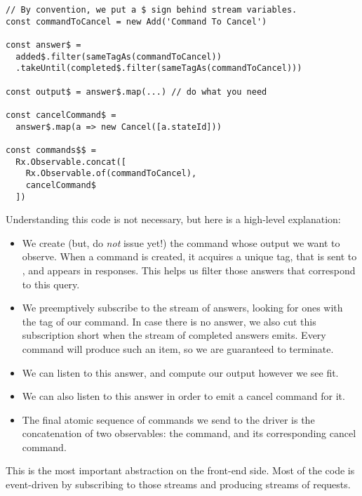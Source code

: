\begin{verbatim}
// By convention, we put a $ sign behind stream variables.
const commandToCancel = new Add('Command To Cancel')

const answer$ =
  added$.filter(sameTagAs(commandToCancel))
  .takeUntil(completed$.filter(sameTagAs(commandToCancel)))

const output$ = answer$.map(...) // do what you need

const cancelCommand$ =
  answer$.map(a => new Cancel([a.stateId]))

const commands$$ =
  Rx.Observable.concat([
    Rx.Observable.of(commandToCancel),
    cancelCommand$
  ])
\end{verbatim}

Understanding this code is not necessary, but here is a high-level explanation:

\begin{itemize}

  \item We create (but, do \emph{not} issue yet!) the command whose output we
want to observe.  When a command is created, it acquires a unique tag, that is
sent to \Coq{}, and appears in responses.  This helps us filter those answers
that correspond to this query.

  \item We preemptively subscribe to the stream of answers, looking for ones
with the tag of our command.  In case there is no answer, we also cut this
subscription short when the stream of completed answers emits.  Every command
will produce such an item, so we are guaranteed to terminate.

  \item We can listen to this answer, and compute our output however we see
fit.

  \item We can also listen to this answer in order to emit a cancel command for
it.

  \item The final atomic sequence of commands we send to the driver is the
concatenation of two observables: the command, and its corresponding cancel
command.

\end{itemize}

This is the most important abstraction on the front-end side.  Most of the code
is event-driven by subscribing to those streams and producing streams of
requests.
